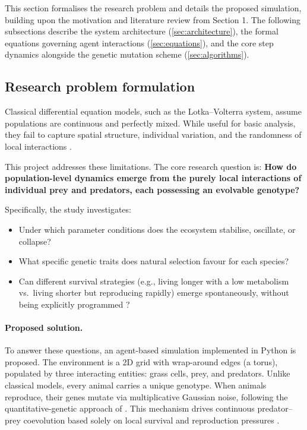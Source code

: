 \documentclass[english]{projectreport}
\begin{document}
This section formalises the research problem and details the proposed simulation, building upon the motivation and literature review from Section 1. The following subsections describe the system architecture (\ref{sec:architecture}), the formal equations governing agent interactions (\ref{sec:equations}), and the core step dynamics alongside the genetic mutation scheme (\ref{sec:algorithms}).

\subsection{Research problem formulation}
\label{sec:problem-formulation}

Classical differential equation models, such as the Lotka–Volterra system, assume populations are continuous and perfectly mixed. While useful for basic analysis, they fail to capture spatial structure, individual variation, and the randomness of local interactions \cite{vanderlaan1995}.

This project addresses these limitations. The core research question is: \textbf{How do population-level dynamics emerge from the purely local interactions of individual prey and predators, each possessing an evolvable genotype?}

Specifically, the study investigates:
\begin{itemize}
    \item Under which parameter conditions does the ecosystem stabilise, oscillate, or collapse?
    \item What specific genetic traits does natural selection favour for each species?
    \item Can different survival strategies (e.g., living longer with a low metabolism vs.\ living shorter but reproducing rapidly) emerge spontaneously, without being explicitly programmed \cite{takashi2013}?
\end{itemize}

\paragraph{Proposed solution.} To answer these questions, an agent-based simulation implemented in Python is proposed. The environment is a 2D grid with wrap-around edges (a torus), populated by three interacting entities: grass cells, prey, and predators. Unlike classical models, every animal carries a unique genotype. When animals reproduce, their genes mutate via multiplicative Gaussian noise, following the quantitative-genetic approach of \cite{dijk2010}. This mechanism drives continuous predator–prey coevolution based solely on local survival and reproduction pressures \cite{takashi2013, ouannes2015, li2023}.
\end{document}
